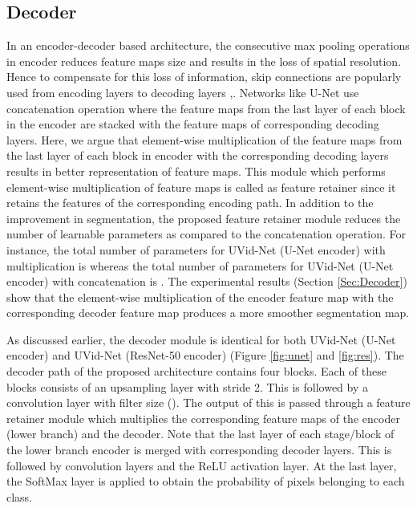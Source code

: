 \documentclass[journal]{IEEEtran}
\begin{document}
\subsection{Decoder} 
\label{SubSec:Decoder}
\par  
In an encoder-decoder based architecture, the consecutive max pooling operations in encoder reduces feature maps size and results in the loss of spatial resolution. Hence to compensate for this loss of information, skip connections are popularly used from encoding layers to decoding layers \cite{2},\cite{4}. Networks like U-Net use concatenation operation where the feature maps from the last layer of each block in the encoder are stacked with the feature maps of corresponding decoding layers. Here, we argue that element-wise multiplication of the feature maps from the last layer of each block in encoder with the corresponding decoding layers results in better representation of feature maps. This module which performs element-wise multiplication of feature maps is called as feature retainer since it retains the features of the corresponding encoding path. In addition to the improvement in segmentation, the proposed feature retainer module reduces the number of learnable parameters as compared to the concatenation operation.  For instance, the total number of parameters for UVid-Net (U-Net encoder) with multiplication is  whereas the total number of parameters for UVid-Net (U-Net encoder) with concatenation is . The experimental results (Section \ref{Sec:Decoder}) show that the element-wise multiplication of the encoder feature map with the corresponding decoder feature map produces a more smoother segmentation map.


As discussed earlier, the decoder module is identical for both UVid-Net (U-Net encoder) and UVid-Net (ResNet-50 encoder) (Figure \ref{fig:unet} and \ref{fig:res}). The decoder path of the proposed architecture contains four blocks. Each of these blocks consists of an upsampling layer with stride 2. This is followed by a convolution layer with filter size (). The output of this is passed through a feature retainer module which multiplies the corresponding feature maps of the encoder (lower branch) and the decoder. Note that the last layer of each stage/block of the lower branch encoder is merged with corresponding decoder layers.  This is followed by convolution layers and the ReLU activation layer. At the last layer, the SoftMax layer is applied to obtain the probability of pixels belonging to each class. 
\end{document}
